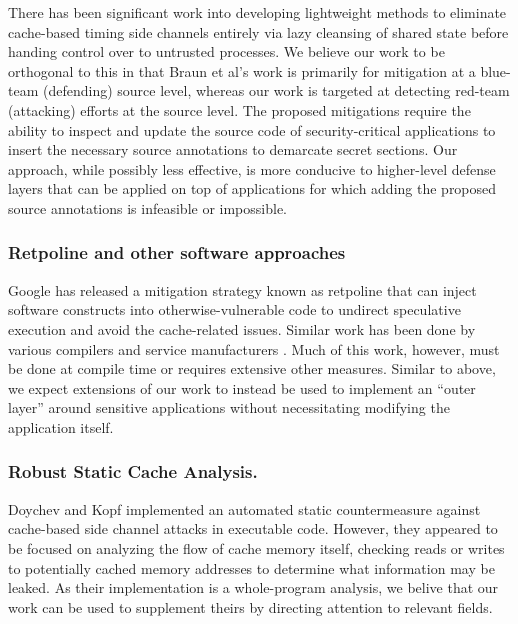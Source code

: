 \documentclass[12pt]{article}
\begin{document}
\begin{multicols*}{2}
  There has been significant work into
  developing lightweight methods to eliminate cache-based timing side channels
  entirely via lazy cleansing of shared state before handing control over to
  untrusted processes\cite{lcache}. We believe our work to be orthogonal to
  this in that Braun et al's work is primarily for mitigation at a
  blue-team (defending) source level, whereas our work is targeted at detecting
  red-team (attacking) efforts at the source level. The proposed mitigations
  require the ability to inspect and update the source code of
  security-critical applications to insert the necessary source annotations to
  demarcate secret sections. Our approach, while possibly less effective, is
  more conducive to higher-level defense layers that can be applied on top of
  applications for which adding the proposed source annotations is infeasible
  or impossible.

  \subsubsection*{Retpoline and other software approaches}

  Google has released a mitigation strategy known as retpoline\cite{retpoline}
  that can inject software constructs into otherwise-vulnerable code to
  undirect speculative execution and avoid the cache-related issues. Similar
  work has been done by various compilers and service manufacturers\cite{gcc}
  \cite{msft}. Much of this work, however, must be done at compile time or
  requires extensive other measures. Similar to above, we expect extensions of
  our work to instead be used to implement an ``outer layer'' around sensitive
  applications without necessitating modifying the application itself.

  \subsubsection*{Robust Static Cache Analysis.}

  Doychev and Kopf implemented an automated static countermeasure against
  cache-based side channel attacks in executable code\cite{rigor}. However,
  they appeared to be focused on analyzing the flow of cache memory itself,
  checking reads or writes to potentially cached memory addresses to determine
  what information may be leaked. As their implementation is a whole-program
  analysis, we belive that our work can be used to supplement theirs by
  directing attention to relevant fields.


\end{multicols*}
\end{document}
